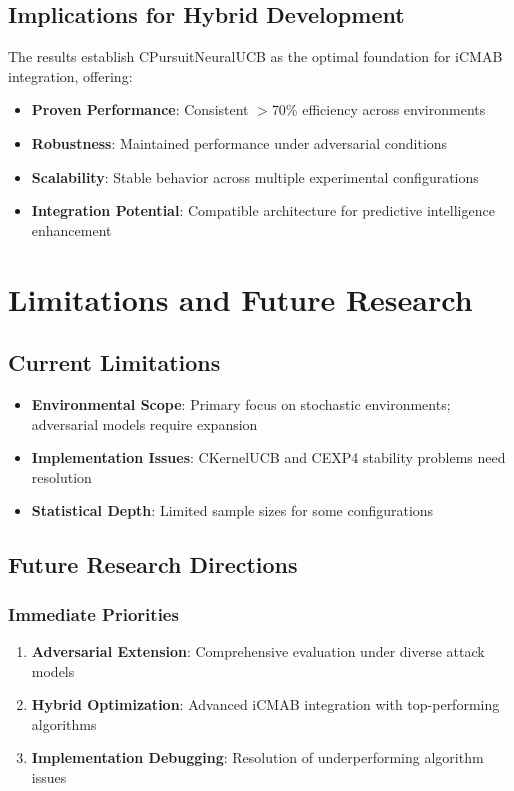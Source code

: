\documentclass[12pt,a4paper]{article}
\begin{document}
\subsection{Implications for Hybrid Development}

The results establish CPursuitNeuralUCB as the optimal foundation for iCMAB integration, offering:

\begin{itemize}
\item \textbf{Proven Performance}: Consistent $>$70\% efficiency across environments
\item \textbf{Robustness}: Maintained performance under adversarial conditions
\item \textbf{Scalability}: Stable behavior across multiple experimental configurations
\item \textbf{Integration Potential}: Compatible architecture for predictive intelligence enhancement
\end{itemize}

\section{Limitations and Future Research}

\subsection{Current Limitations}

\begin{itemize}
\item \textbf{Environmental Scope}: Primary focus on stochastic environments; adversarial models require expansion
\item \textbf{Implementation Issues}: CKernelUCB and CEXP4 stability problems need resolution
\item \textbf{Statistical Depth}: Limited sample sizes for some configurations
\end{itemize}

\subsection{Future Research Directions}

\subsubsection{Immediate Priorities}
\begin{enumerate}
\item \textbf{Adversarial Extension}: Comprehensive evaluation under diverse attack models
\item \textbf{Hybrid Optimization}: Advanced iCMAB integration with top-performing algorithms
\item \textbf{Implementation Debugging}: Resolution of underperforming algorithm issues
\end{enumerate}
\end{document}
